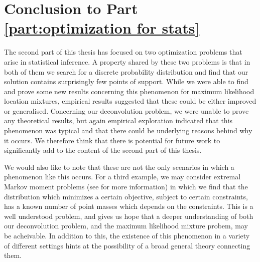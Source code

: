 \chapter{Conclusion to Part \ref{part:optimization for stats}}
\label{Ch:StatisticalOptimizationConclusion}


\graphicspath{{Figures/Mixtures/}}


The second part of this thesis has focused on two optimization problems that arise in statistical inference. A property shared by these two problems is that in both of them we search for a discrete probability distribution and find that our solution contains surprisingly few points of support. While we were able to find and prove some new results concerning this phenomenon for maximum likelihood location mixtures, empirical results suggested that these could be either improved or generalised. Concerning our deconvolution problem, we were unable to prove any theoretical results, but again empirical exploration indicated that this phenomenon was typical and that there could be underlying reasons behind why it occurs. We therefore think that there is potential for future work to significantly add to the content of the second part of this thesis. 

We would also like to note that these are not the only scenarios in which a phenomenon like this occurs. For a third example, we may consider extremal Markov moment problems (see \cite{Krein1977-ak} for more information) in which we find that the distribution which minimizes a certain objective, subject to certain constraints, has a known number of point masses which depends on the constraints. This is a well understood problem, and gives us hope that a deeper understanding of both our deconvolution problem, and the maximum likelihood mixture probem, may be acheivable. In addition to this, the existence of this phenomenon in a variety of different settings hints at the possibility of a broad general theory connecting them.

